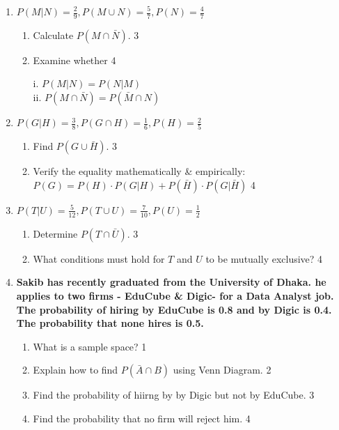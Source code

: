 \documentclass[a4paper,oneside, margin=1.4in]{book}
\begin{document}
\begin{enumerate}
\item \textbf{\( P(M \vert N) = \frac{2}{9}, P(M \cup N) = \frac{5}{7}, P(N) = \frac{4}{7} \)}

\begin{enumerate}
    \item Calculate \( P(M \cap \bar{N}) \). \hfill 3
    \item Examine whether   \hfill 4
    
    i. $P(M \vert N) = P(N \vert M)$ \\
    ii. $P(M \cap \bar N) = P(\bar M \cap N)$

\end{enumerate}

\item \textbf{\( P(G \vert H) = \frac{3}{8}, P(G \cap H) = \frac{1}{6}, P(H) = \frac{2}{5} \)}

\begin{enumerate}
    \item Find \( P(G \cup \bar{H}) \). \hfill 3
	\item Verify the equality mathematically \& empirically: \\ $P(G) = P(H) \cdot P(G \vert H) + P(\bar H) \cdot P(G \vert \bar H)$ \hfill 4
\end{enumerate}

\item \textbf{\( P(T \vert U) = \frac{5}{12}, P(T \cup U) = \frac{7}{10}, P(U) = \frac{1}{2} \)}

\begin{enumerate}
    \item Determine \( P(T \cap \bar{U}) \). \hfill 3
    \item What conditions must hold for \( T \) and \( U \) to be mutually exclusive? \hfill 4
\end{enumerate}



 \item
  \textbf{Sakib has recently graduated from the University of Dhaka. he applies to two firms - EduCube \& Digic- for a Data Analyst job. The probability of hiring by EduCube is 0.8 and by Digic is 0.4. The probability that none hires is 0.5.} 
  
  \begin{enumerate}
    \item
	What is a sample space? \hfill 1
    \item
	Explain how to find $P(\bar A \cap B)$ using Venn Diagram. \hfill 2
    \item  
	Find the probability of hiirng by by Digic but not by EduCube. \hfill 3
    \item
	Find the probability that no firm will reject him. \hfill 4
  \end{enumerate}


\end{enumerate}
\end{document}
